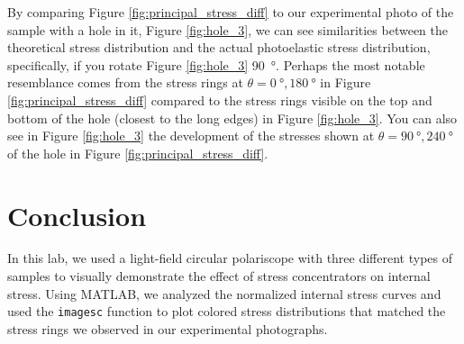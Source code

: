 \documentclass[12 pt]{article}
\begin{document}
By comparing Figure \ref{fig:principal_stress_diff} to our experimental photo of the sample with a hole in it, Figure \ref{fig:hole_3}, we can see similarities between the theoretical stress distribution and the actual photoelastic stress distribution, specifically, if you rotate Figure \ref{fig:hole_3} \qty{90}{\degree}. Perhaps the most notable resemblance comes from the stress rings at $\theta=\qty{0}{\degree},
\qty{180}{\degree}$ in Figure \ref{fig:principal_stress_diff} compared to the stress rings visible on the top and bottom of the hole (closest to the long edges) in Figure \ref{fig:hole_3}. You can also see in Figure \ref{fig:hole_3} the development of the stresses shown at $\theta=\qty{90}{\degree},\qty{240}{\degree}$ of the hole in Figure \ref{fig:principal_stress_diff}.

\section{Conclusion} \label{conclusion}
In this lab, we used a light-field circular polariscope with three different types of samples to visually demonstrate the effect of stress concentrators on internal stress. Using MATLAB, we analyzed the normalized internal stress curves and used the \texttt{imagesc} function to plot colored stress distributions that matched the stress rings we observed in our experimental photographs.
\end{document}
